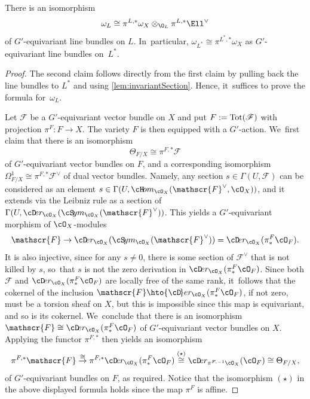 \begin{lem} \label{lem:canonicalBundleOnL}
There is an isomorphism
\[
\omega_L \cong \pi^{L,*} \omega_X \otimes_{\O_L} \pi^{L,*} \Ell^\vee
\]
of $G'$-equivariant line bundles on $L$. In~particular,
$\omega_{L^*} \cong \pi^{L^*,*} \omega_X$
as $G'$-equivariant line bundles on~$L^*$.
\end{lem}

\begin{proof}
The second claim follows directly from the first claim by pulling back the line bundles to $L^*$ and using \cref{lem:invariantSection}. Hence, it~suffices to prove the formula for~$\omega_L$.

Let $\mathscr{F}$ be a $G'$-equivariant vector bundle on $X$ and put $F:=\textup{Tot}(\mathscr{F})$ with projection $\pi^F\colon F\to X$.
The variety $F$ is then equipped with a $G'$-action. We~first claim that there is an isomorphism
\[
\Theta_{F/X} \cong \pi^{F,*}\mathscr{F}
\]
of $G'$-equivariant vector bundles on $F$,
and a corresponding isomorphism $\Omega^1_{F/X}\cong \pi^{F,*}\mathscr{F}^\vee$ of dual vector bundles. Namely, any section $s\in\Gamma(U,\mathscr{F})$ can be
considered as an element $s\in \Gamma(U,{\cH\!}om_{\cO_X}(\mathscr{F}^\vee,\cO_X))$,
and it extends via the Leibniz rule as a section of
$\Gamma(U,{\cD\!}er_{\cO_X}({\cS\!}ym_{\cO_X}(\mathscr{F}^\vee))$. This yields a $G'$-equivariant morphism of $\cO_X$\nobreakdash-mod\-ules
\[
\mathscr{F} \to
{\cD\!}er_{\cO_X}({\cS\!}ym_{\cO_X}(\mathscr{F}^\vee))=
{\cD\!}er_{\cO_X}(\pi^F_*\cO_F).
\]
It is also injective,
since for any $s\neq 0$, there is some section of $\mathscr{F}^\vee$ that
is not killed by $s$, so~that $s$ is not the zero derivation in ${\cD\!}er_{\cO_X}(\pi^F_*\cO_F)$. Since both $\mathscr{F}$ and ${\cD\!}er_{\cO_X}(\pi^F_*\cO_F)$
are locally free of the same rank, it~follows that the cokernel of the inclusion
$\mathscr{F} \hto {\cD\!}er_{\cO_X}(\pi^F_*\cO_F)$, if not zero, must be a torsion sheaf on $X$, but this is impossible since this map is equivariant, and so is its cokernel. We~conclude that there is an isomorphism
$\mathscr{F} \cong {\cD\!}er_{\cO_X}(\pi^F_*\cO_F)$ of $G'$-equivariant vector bundles on $X$. Applying the functor $\pi^{F,*}$ then
yields an isomorphism
\[
\pi^{F,*}\mathscr{F} \stackrel{\cong}{\to} \pi^{F,*}
{\cD\!}er_{\cO_X}(\pi^F_*\cO_F) \stackrel{(\star)}{\cong}
{\cD\!}er_{\pi^{F,-1}\cO_X}(\cO_F) \cong \Theta_{F/X},
\]
of $G'$-equivariant bundles on $F$, as required. Notice that the isomorphism $(\star)$ in the above displayed formula holds since the map $\pi^F$ is affine.


\end{proof}
